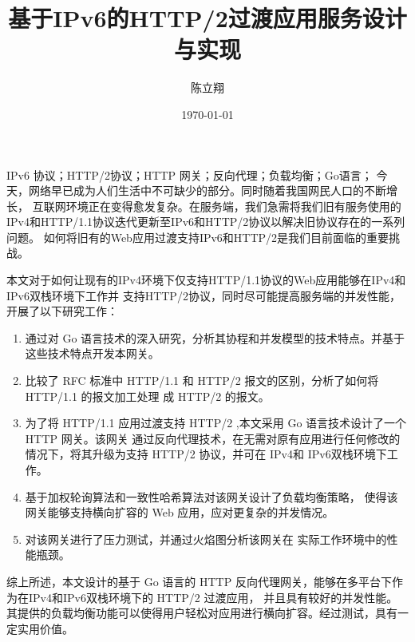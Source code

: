 \documentclass[twoside]{CUGThesis}
\title{基于IPv6的HTTP/2过渡应用服务设计与实现} %
\author{陈立翔} %
\date{\today} %
\begin{document}
	\maketitle
	

	\begin{cnabstract}{IPv6 协议；HTTP/2协议；HTTP 网关；反向代理；负载均衡；Go语言；}
		今天，网络早已成为人们生活中不可缺少的部分。同时随着我国网民人口的不断增长，
	互联网环境正在变得愈发复杂。在服务端，我们急需将我们旧有服务使用的IPv4和HTTP/1.1协议迭代更新至IPv6和HTTP/2协议以解决旧协议存在的一系列问题。
	如何将旧有的Web应用过渡支持IPv6和HTTP/2是我们目前面临的重要挑战。\par
		本文对于如何让现有的IPv4环境下仅支持HTTP/1.1协议的Web应用能够在IPv4和IPv6双栈环境下工作并
	支持HTTP/2协议，同时尽可能提高服务端的并发性能，开展了以下研究工作：
	\begin{enumerate}
		\item 通过对 Go 语言技术的深入研究，分析其协程和并发模型的技术特点。并基于这些技术特点开发本网关。
		\item 比较了 RFC 标准中 HTTP/1.1 和 HTTP/2 报文的区别，分析了如何将 HTTP/1.1 的报文加工处理
		成 HTTP/2 的报文。
		\item 为了将 HTTP/1.1 应用过渡支持 HTTP/2 ,本文采用 Go 语言技术设计了一个 HTTP 网关。该网关
		通过反向代理技术，在无需对原有应用进行任何修改的情况下，将其升级为支持 HTTP/2 协议，并可在 IPv4和
		IPv6双栈环境下工作。
		\item 基于加权轮询算法和一致性哈希算法对该网关设计了负载均衡策略，
		使得该网关能够支持横向扩容的 Web 应用，应对更复杂的并发情况。
		\item 对该网关进行了压力测试，并通过火焰图分析该网关在
		实际工作环境中的性能瓶颈。
	\end{enumerate}
		\par
		综上所述，本文设计的基于 Go 语言的 HTTP 反向代理网关，能够在多平台下作为在IPv4和IPv6双栈环境下的 HTTP/2 过渡应用，
	并且具有较好的并发性能。其提供的负载均衡功能可以使得用户轻松对应用进行横向扩容。经过测试，具有一定实用价值。
	\end{cnabstract}
	
\end{document}
